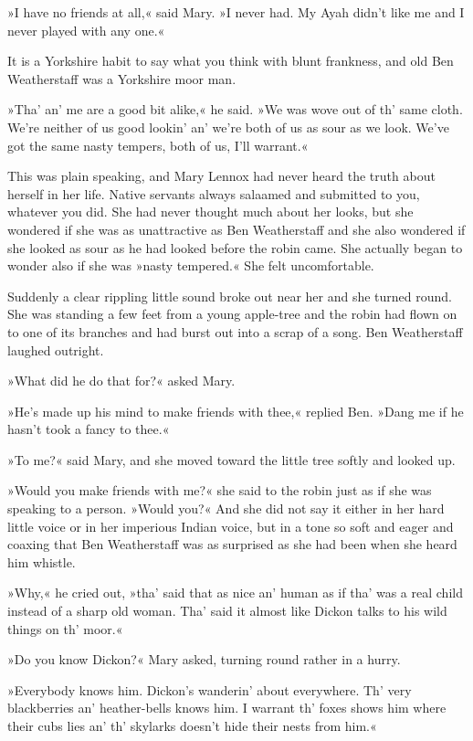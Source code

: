 »I have no friends at all,« said Mary. »I never had. My Ayah didn't like me and I never played with any one.«

It is a Yorkshire habit to say what you think with blunt frankness, and old Ben Weatherstaff was a Yorkshire moor man.

»Tha' an' me are a good bit alike,« he said. »We was wove out of th' same cloth. We're neither of us good lookin' an' we're both of us as sour as we look. We've got the same nasty tempers, both of us, I'll warrant.«

This was plain speaking, and Mary Lennox had never heard the truth about herself in her life. Native servants always salaamed and submitted to you, whatever you did. She had never thought much about her looks, but she wondered if she was as unattractive as Ben Weatherstaff and she also wondered if she looked as sour as he had looked before the robin came. She actually began to wonder also if she was »nasty tempered.« She felt uncomfortable.

Suddenly a clear rippling little sound broke out near her and she turned round. She was standing a few feet from a young apple-tree and the robin had flown on to one of its branches and had burst out into a scrap of a song. Ben Weatherstaff laughed outright.

»What did he do that for?« asked Mary.

»He's made up his mind to make friends with thee,« replied Ben. »Dang me if he hasn't took a fancy to thee.«

»To me?« said Mary, and she moved toward the little tree softly and looked up.

»Would you make friends with me?« she said to the robin just as if she was speaking to a person. »Would you?« And she did not say it either in her hard little voice or in her imperious Indian voice, but in a tone so soft and eager and coaxing that Ben Weatherstaff was as surprised as she had been when she heard him whistle.

»Why,« he cried out, »tha' said that as nice an' human as if tha' was a real child instead of a sharp old woman. Tha' said it almost like Dickon talks to his wild things on th' moor.«

»Do you know Dickon?« Mary asked, turning round rather in a hurry.

»Everybody knows him. Dickon's wanderin' about everywhere. Th' very blackberries an' heather-bells knows him. I warrant th' foxes shows him where their cubs lies an' th' skylarks doesn't hide their nests from him.«

